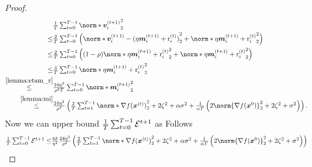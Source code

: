 \documentclass{article}
\begin{document}
\begin{proof}
  \begin{align*}
                                         & \tfrac{1}{T} \tsum_{t=0}^{T-1} \norm*{\vv_i^{(t+1)}}_2^2                                                                                                                                                                    \\
    \le                                  & \tfrac{2}{T} \tsum_{t=0}^{T-1} \left(\norm*{\vv_i^{(t+1)}-(\eta \mm_i^{(t+1)} + \rr_i^{(t)} ) }_2^2
    + \norm*{ \eta \mm_i^{(t+1)} + \rr_i^{(t)} }_2^2 \right)                                                                                                                                                                                                           \\
    \le                                  & \tfrac{2}{T} \tsum_{t=0}^{T-1} \left((1-\rho)\norm*{\eta \mm_i^{(t+1)} + \rr_i^{(t)} }_2^2
    + \norm*{ \eta \mm_i^{(t+1)} + \rr_i^{(t)} }_2^2 \right)                                                                                                                                                                                                           \\
    \le                                  & \tfrac{4}{T} \tsum_{t=0}^{T-1} \norm*{ \eta \mm_i^{(t+1)} + \rr_i^{(t)} }_2^2                                                                                                                                               \\
    \stackrel{\Cref{lemma:etam_r} }{\le} & \tfrac{24\eta^2}{\rho^2 T} \tsum_{t=0}^{T-1} \norm*{ \mm_i^{(t+1)} }_2^2                                                                                                                                                    \\
    \stackrel{\Cref{lemma:mi} }{\le}     & \tfrac{24\eta^2}{\rho^2} \left( \tfrac{2}{T}\tsum_{t=1}^{T-1}  \norm*{ \nabla f(\xx^{(t)}) }_2^2 + 2\zeta^2 + \alpha\sigma^2 + \tfrac{1}{\alpha T}\left(2\norm{\nabla f(\xx^0)}_2^2 + 2\zeta^2 + \sigma^2 \right)  \right).
  \end{align*}
  Now we can upper bound $\tfrac{1}{T}\textstyle\sum_{t=0}^{T-1}\mathcal{E}^{t+1}$ as Follows
  \begin{align*}
    \tfrac{1}{T}\tsum_{t=0}^{T-1}\cE^{t+1}
    \le & \tfrac{6\delta}{\eta^2} \tfrac{24\eta^2}{\rho^2} \left( \tfrac{2}{T}\tsum_{t=1}^{T-1} \norm*{ \nabla f(\xx^{(t)}) }_2^2 + 2\zeta^2 + \alpha\sigma^2 + \tfrac{1}{\alpha T}\left(2\norm{\nabla f(\xx^0)}_2^2 + 2\zeta^2 + \sigma^2 \right)  \right) \\

\end{align*}
\end{proof}
\end{document}
